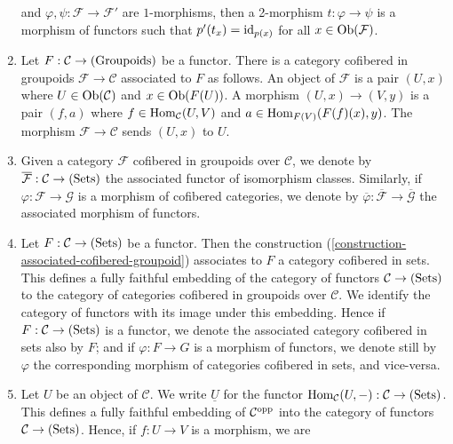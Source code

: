 \begin{remarks}
\begin{enumerate}
and $\varphi, \psi: \mathcal F \rightarrow \mathcal F'$ are $1$-morphisms, then 
a 2-morphism $t: \varphi \rightarrow \psi$ is a morphism of functors such that 
$p'(t_x) = \textnormal{id}_{p(x)}$ for all $x \in \textnormal{Ob}(\mathcal F)$.
\item
\label{construction-associated-cofibered-groupoid} 
Let $F: \mathcal C \rightarrow \textnormal{(Groupoids)}$ be a functor.  There 
is a category cofibered in groupoids $\mathcal F \rightarrow \mathcal C$ 
associated to $F$ as follows.  An object of $\mathcal F$ is a pair $(U,x)$ 
where $U \in \textnormal{Ob}(\mathcal C)$ and $x \in \textnormal{Ob}(F(U))$.  A 
morphism $(U,x) \rightarrow (V,y)$ is a pair $(f,a)$ where $f \in 
\textnormal{Hom}_{\mathcal C}(U,V)$ and $a \in 
\textnormal{Hom}_{F(V)}(F(f)(x),y)$.  The morphism $\mathcal F \rightarrow 
\mathcal C$ sends $(U,x)$ to $U$.
\item Given a category $\mathcal F$ cofibered in groupoids over $\mathcal C$, 
we denote by $\overline{\mathcal{F}} : \mathcal C \rightarrow 
\textnormal{(Sets)}$ the associated functor of isomorphism classes. Similarly, 
if $\varphi: \mathcal F \rightarrow \mathcal G$ is a morphism of cofibered 
categories, we denote by $\overline{\varphi}: \overline{\mathcal F} \rightarrow 
\overline{\mathcal G}$ the associated morphism of functors.
\item 
\label{convention-cofibered-sets}
Let $F: \mathcal C \rightarrow \textnormal{(Sets)}$ be a functor.  Then the 
construction (\ref{construction-associated-cofibered-groupoid}) associates to 
$F$ a category cofibered in sets. This defines a fully faithful embedding of 
the category of functors $\mathcal C \rightarrow \textnormal{(Sets)}$ to the 
category of categories cofibered in groupoids over $\mathcal C$. We identify 
the category of functors with its image under this embedding. Hence if $F: 
\mathcal C \rightarrow \textnormal{(Sets)}$ is a functor, we denote the 
associated category cofibered in sets also by $F$; and if $\varphi: F 
\rightarrow G$ is a morphism of functors, we denote still by $\varphi$ the 
corresponding morphism of categories cofibered in sets, and vice-versa.
\item 
\label{definition-yoneda}
Let $U$ be an object of $\mathcal C$.  We write $\underline{U}$ for the functor 
$\textnormal{Hom}_{\mathcal C}(U,-): \mathcal C \rightarrow 
\textnormal{(Sets)}$.  This defines a fully faithful embedding of $\mathcal 
C^{\textnormal{opp}}$ into the category of functors $\mathcal C \rightarrow 
\textnormal{(Sets)}$. Hence, if $f: U \rightarrow V$ is a morphism, we are 

\end{enumerate}
\end{remarks}
